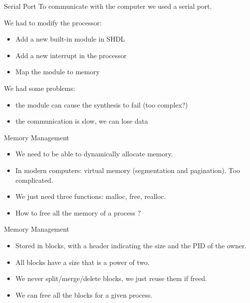 \documentclass{beamer}
\begin{document}
    \begin{frame}{Serial Port}
      To communicate with the computer we used a serial port.

      \pause
      We had to modify the processor:
      \begin{itemize}
        \item Add a new built-in module in SHDL
        \item Add a new interrupt in the processor
        \item Map the module to memory
      \end{itemize}

      \pause
      We had some problems:
      \begin{itemize}
        \item the module can cause the synthesis to fail (too complex?)
        \item the communication is slow, we can lose data
      \end{itemize}
    \end{frame}

    \begin{frame}{Memory Management}
      \begin{itemize}
        \item We need to be able to dynamically allocate memory.
        \item In modern computers: virtual memory (segmentation and pagination).
          Too complicated.
        \item We just need three functions: malloc, free, realloc.
        \item How to free all the memory of a process ?
      \end{itemize}
    \end{frame}

    \begin{frame}{Memory Management}
      \begin{itemize}
        \item Stored in blocks, with a header indicating the size and the PID of
          the owner.
        \item All blocks have a size that is a power of two.
        \item We never split/merge/delete blocks, we just reuse them if freed.
        \item We can free all the blocks for a given process.
      \end{itemize}
    \end{frame}
\end{document}
